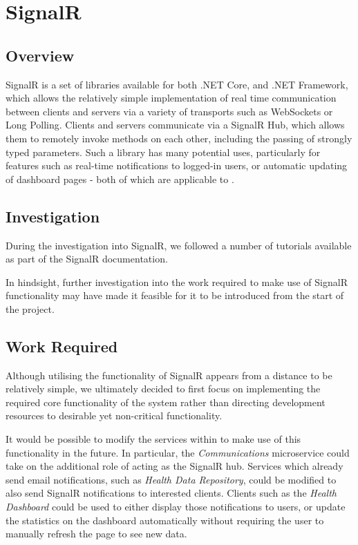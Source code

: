 \section{SignalR}

\subsection{Overview}

SignalR is a set of libraries available for both .NET Core, and .NET Framework, which allows the relatively simple implementation of real time communication between clients and servers via a variety of transports such as WebSockets or Long Polling\cite{SignalR}. Clients and servers communicate via a SignalR Hub, which allows them to remotely invoke methods on each other, including the passing of strongly typed parameters. Such a library has many potential uses, particularly for features such as real-time notifications to logged-in users, or automatic updating of dashboard pages - both of which are applicable to .

\subsection{Investigation}

During the investigation into SignalR, we followed a number of tutorials available as part of the SignalR documentation.

In hindsight, further investigation into the work required to make use of SignalR functionality may have made it feasible for it to be introduced from the start of the project.

\subsection{Work Required}

Although utilising the functionality of SignalR appears from a distance to be relatively simple, we ultimately decided to first focus on implementing the required core functionality of the system rather than directing development resources to desirable yet non-critical functionality.

It would be possible to modify the services within  to make use of this functionality in the future. In particular, the \textit{Communications} microservice could take on the additional role of acting as the SignalR hub. Services which already send email notifications, such as \textit{Health Data Repository}, could be modified to also send SignalR notifications to interested clients. Clients such as the \textit{Health Dashboard} could be used to either display those notifications to users, or update the statistics on the dashboard automatically without requiring the user to manually refresh the page to see new data.

